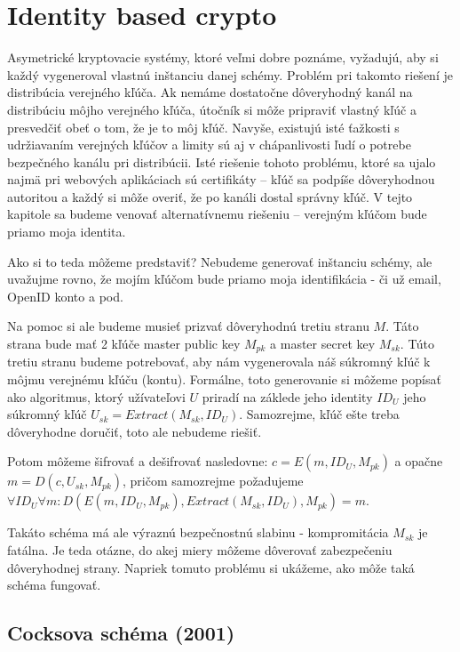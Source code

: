 \section{Identity based crypto}

Asymetrické kryptovacie systémy, ktoré veľmi dobre poznáme, vyžadujú,
aby si každý vygeneroval vlastnú inštanciu danej schémy. Problém pri
takomto riešení je distribúcia verejného kľúča. Ak nemáme dostatočne
dôveryhodný kanál na distribúciu môjho verejného kľúča, útočník si
môže pripraviť vlastný kľúč a presvedčiť obeť o tom, že je to môj
kľúč. Navyše, existujú isté ťažkosti s udržiavaním verejných kľúčov a
limity sú aj v chápanlivosti ľudí o potrebe bezpečného kanálu pri
distribúcii.
Isté riešenie tohoto problému,
ktoré sa ujalo najmä pri webových aplikáciach sú certifikáty --
kľúč sa podpíše dôveryhodnou autoritou a každý si môže
overiť, že po kanáli dostal správny kľúč. V tejto kapitole sa budeme
venovať alternatívnemu riešeniu -- verejným kľúčom bude priamo moja
identita.

Ako si to teda môžeme predstaviť? Nebudeme generovať inštanciu schémy,
ale uvažujme rovno, že mojím kľúčom bude priamo moja identifikácia -
či už email, OpenID konto a pod.

Na pomoc si ale budeme musieť prizvať dôveryhodnú tretiu stranu $M$.
Táto strana bude mať 2 kľúče master public key $M_{pk}$ a master
secret key $M_{sk}$. Túto tretiu stranu budeme potrebovať, aby nám
vygenerovala náš súkromný kľúč k môjmu verejnému kľúču (kontu).
Formálne, toto generovanie si môžeme popísať ako algoritmus, ktorý
užívateľovi $U$ priradí na záklede jeho identity $ID_U$ jeho súkromný
kľúč $U_{sk} = Extract(M_{sk}, ID_U)$. Samozrejme, kľúč ešte treba
dôveryhodne doručiť, toto ale nebudeme riešiť.

Potom môžeme šifrovať a dešifrovať nasledovne:
$c=E(m,ID_U,M_{pk})$ a opačne $m = D(c, U_{sk}, M_{pk})$, pričom
samozrejme požadujeme
$\forall ID_U \forall m: D(E(m, ID_U, M_{pk}), Extract(M_{sk},ID_U),
M_{pk})=m$.

Takáto schéma má ale výraznú bezpečnostnú slabinu - kompromitácia
$M_{sk}$ je fatálna. Je teda otázne, do akej miery môžeme dôverovať
zabezpečeniu dôveryhodnej strany. Napriek tomuto problému si ukážeme,
ako môže taká schéma fungovať.

\subsection{Cocksova schéma (2001)}

